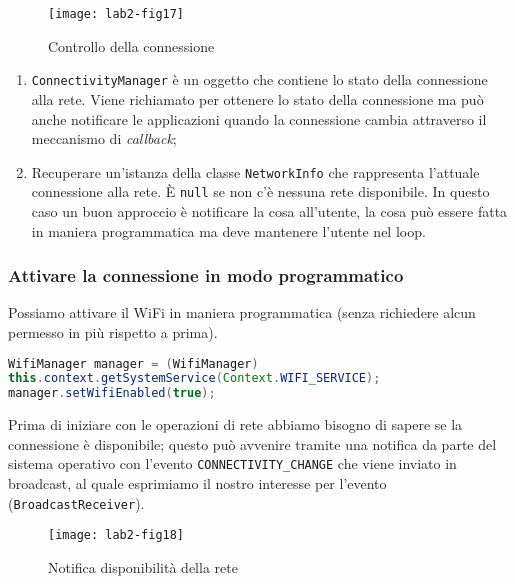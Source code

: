 \begin{figure*}[htbp]
        \centering
        \texttt{[image: lab2-fig17]}
        \caption[Controllo connessione]{Controllo della connessione}
        \label{img:lab2-fig17}
\end{figure*}

\begin{enumerate}
\item \texttt{ConnectivityManager} è un oggetto che contiene lo stato della
connessione alla rete. Viene richiamato per ottenere lo stato della connessione
ma può anche notificare le applicazioni quando la connessione cambia attraverso
il meccanismo di \textit{callback};
\item Recuperare un'istanza della classe \texttt{NetworkInfo} che rappresenta
l'attuale connessione alla rete. È \texttt{null} se non c'è nessuna rete
disponibile. In questo caso un buon approccio è notificare la cosa all'utente,
la cosa può essere fatta in maniera programmatica ma deve mantenere l'utente nel
loop.
\end{enumerate}

\subsubsection{Attivare la connessione in modo programmatico}

Possiamo attivare il WiFi in maniera programmatica (senza richiedere alcun
permesso in più rispetto a prima).

\begin{lstlisting}[language=Java, basicstyle=\footnotesize]
WifiManager manager = (WifiManager)
this.context.getSystemService(Context.WIFI_SERVICE);
manager.setWifiEnabled(true);
\end{lstlisting}

Prima di iniziare con le operazioni di rete abbiamo bisogno di sapere se la
connessione è disponibile; questo può avvenire tramite una notifica da parte del
sistema operativo con l'evento \texttt{CONNECTIVITY\_CHANGE} che viene inviato
in broadcast, al quale esprimiamo il nostro interesse per l'evento
(\texttt{BroadcastReceiver}).

\begin{figure*}[htbp]
        \centering
        \texttt{[image: lab2-fig18]}
        \caption[Disponibilità rete]{Notifica disponibilità della rete}
        \label{img:lab2-fig18}
\end{figure*}

